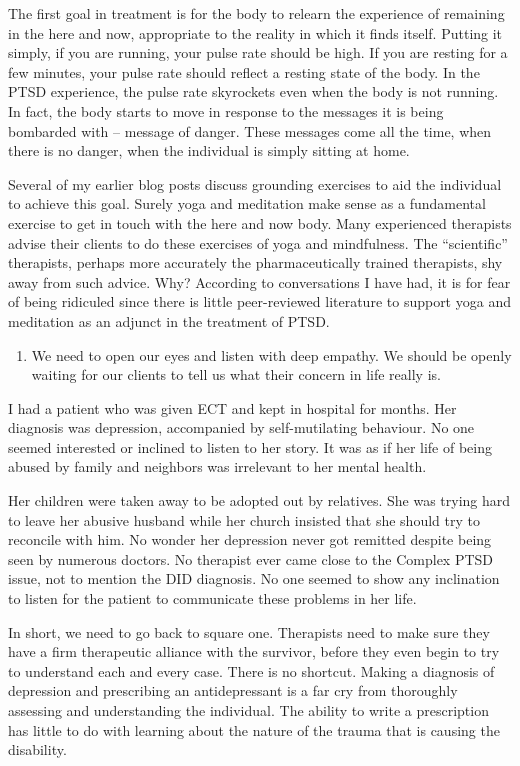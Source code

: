 \documentclass[]{book}
\providecommand{\tightlist}{%
  \setlength{\itemsep}{0pt}\setlength{\parskip}{0pt}}
\begin{document}
The first goal in treatment is for the body to relearn the experience of remaining in the here and now, appropriate to the reality in which it finds itself. Putting it simply, if you are running, your pulse rate should be high. If you are resting for a few minutes, your pulse rate should reflect a resting state of the body. In the PTSD experience, the pulse rate skyrockets even when the body is not running. In fact, the body starts to move in response to the messages it is being bombarded with -- message of danger. These messages come all the time, when there is no danger, when the individual is simply sitting at home.

Several of my earlier blog posts discuss grounding exercises to aid the individual to achieve this goal. Surely yoga and meditation make sense as a fundamental exercise to get in touch with the here and now body. Many experienced therapists advise their clients to do these exercises of yoga and mindfulness. The ``scientific'' therapists, perhaps more accurately the pharmaceutically trained therapists, shy away from such advice. Why? According to conversations I have had, it is for fear of being ridiculed since there is little peer-reviewed literature to support yoga and meditation as an adjunct in the treatment of PTSD.

\begin{enumerate}
\def\labelenumi{\arabic{enumi}.}
\setcounter{enumi}{1}
\tightlist
\item
  We need to open our eyes and listen with deep empathy. We should be openly waiting for our clients to tell us what their concern in life really is.
\end{enumerate}

I had a patient who was given ECT and kept in hospital for months. Her diagnosis was depression, accompanied by self-mutilating behaviour. No one seemed interested or inclined to listen to her story. It was as if her life of being abused by family and neighbors was irrelevant to her mental health.

Her children were taken away to be adopted out by relatives. She was trying hard to leave her abusive husband while her church insisted that she should try to reconcile with him. No wonder her depression never got remitted despite being seen by numerous doctors. No therapist ever came close to the Complex PTSD issue, not to mention the DID diagnosis. No one seemed to show any inclination to listen for the patient to communicate these problems in her life.

In short, we need to go back to square one. Therapists need to make sure they have a firm therapeutic alliance with the survivor, before they even begin to try to understand each and every case. There is no shortcut. Making a diagnosis of depression and prescribing an antidepressant is a far cry from thoroughly assessing and understanding the individual. The ability to write a prescription has little to do with learning about the nature of the trauma that is causing the disability.
\end{document}
